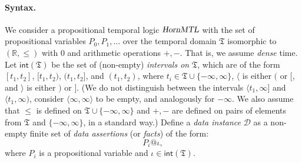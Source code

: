 \documentclass{article}
\renewcommand{\int}{\mathsf{int}}
\newcommand{\D}{\mathcal{D}}
\newcommand{\hMTL}{\textsl{HornMTL}}
\begin{document}
\paragraph{Syntax.} We consider a propositional temporal logic $\hMTL$ with the set of propositional variables $P_0, P_1,
\dots$ over the temporal domain $\mathfrak T$ isomorphic to $(\mathbb R, \leqslant)$ with $0$ and arithmetic operations $+,-$.  That is, we assume \emph{dense} time. Let $\int(\mathfrak{T})$ be the set of (non-empty) \emph{intervals on} $\mathfrak{T}$, which are of the form $[t_1, t_2]$, $[t_1, t_2)$, $(t_1, t_2]$, and $(t_1, t_2)$, where $t_i \in \mathfrak{T} \cup  \{-\infty, \infty\}$, $\langle$ is either $($ or $[$, and $\rangle$ is either $)$ or $]$. (We do not distinguish between the intervals $\langle t_1, \infty]$ and $\langle t_1, \infty)$, consider $\langle \infty, \infty \rangle$ to be empty, and analogously for $-\infty$. We also assume that $\leq$ is defined on $\mathfrak{T} \cup \{-\infty, \infty\}$ and $+,-$ are defined on pairs of elements from $\mathfrak T$ and $\{-\infty, \infty\}$, in a standard way.) Define a \emph{data instance} $\D$ as a non-empty finite set of \emph{data assertions} (or \emph{facts}) of the form:
%
$$P_i@\iota,$$
%
where $P_i$ is a propositional variable and $\iota \in \int(\mathfrak{T})$. %
\end{document}
